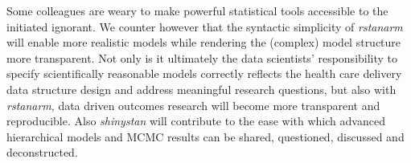 \documentclass[11pt,notitlepage]{article}
\begin{document}
Some colleagues are weary to make powerful statistical tools accessible to the initiated ignorant. We counter however that the syntactic simplicity of \textit{rstanarm} will enable more realistic models while rendering the (complex) model structure more transparent. Not only is it ultimately the data scientists' responsibility to specify scientifically reasonable  models correctly reflects the health care delivery data structure design and address meaningful research questions, but also with \textit{rstanarm}, data driven outcomes research will become more transparent and reproducible. Also \textit{shinystan} will contribute to the ease with which advanced hierarchical models and MCMC results can be shared, questioned, discussed and deconstructed.
 



\newpage


\end{document}
